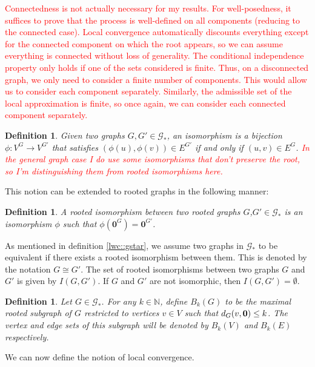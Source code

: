 \documentclass[12pt]{article}
\newcommand{\mb}{\mathbb}
\newcommand{\mc}{\mathcal}
\newcommand{\ra}{\rightarrow}
\newcommand{\tr}{\textcolor{red}}
\newcommand{\ind}{\hspace{24pt}}
\renewcommand{\root}{\mathbf{0}}					%
\newcommand{\met}[2]{
\ifstrempty{#2}{
	d_{#1}}{
	d_{#1,#2}}}										%
\newcommand{\gind}[1]{^{#1}}						%
\newcommand{\Gs}{\mc{G}_\ast}						%
\newcommand{\iso}{I}								%
\newcommand{\trnc}[1]{B_{#1}}						%
\newtheorem{defn}[thms]{Definition}
\begin{document}
\ind \tr{Connectedness is not actually necessary for my results. For well-posedness, it suffices to prove that the process is well-defined on all components (reducing to the connected case). Local convergence automatically discounts everything except for the connected component on which the root appears, so we can assume everything is connected without loss of generality. The conditional independence property only holds if one of the sets considered is finite. Thus, on a disconnected graph, we only need to consider a finite number of components. This would allow us to consider each component separately. Similarly, the admissible set of the local approximation is finite, so once again, we can consider each connected component separately.}

\begin{defn}
Given two graphs \(G,G' \in \Gs\), an isomorphism is a bijection \(\phi: V\gind{G} \ra V\gind{G'}\) that satisfies \((\phi(u),\phi(v)) \in E\gind{G'}\) if and only if \((u,v) \in E\gind{G}\). \tr{In the general graph case I do use some isomorphisms that don't preserve the root, so I'm distinguishing them from rooted isomorphisms here.}
\label{lwc::iso}
\end{defn}

This notion can be extended to rooted graphs in the following manner:

\begin{defn}
A rooted isomorphism between two rooted graphs \(G\),\(G' \in \Gs\) is an isomorphism \(\phi\) such that \(\phi(\root\gind{G}) = \root\gind{G'}\).
\label{lwc::riso}
\end{defn}

As mentioned in definition \ref{lwc::gstar}, we assume two graphs in \(\Gs\) to be equivalent if there exists a rooted isomorphism between them. This is denoted by the notation \(G \cong G'\). The set of rooted isomorphisms between two graphs \(G\) and \(G'\) is given by \(\iso(G,G')\). If \(G\) and \(G'\) are not isomorphic, then \(\iso(G,G') = \emptyset\).

\begin{defn}
Let \(G \in \Gs\). For any \(k \in \mb{N}\), define \(\trnc{k}(G)\) to be the maximal rooted subgraph of \(G\) restricted to vertices \(v \in V\) such that \(\met{G}{}(v,\root) \leq k\). The vertex and edge sets of this subgraph will be denoted by \(\trnc{k}(V)\) and \(\trnc{k}(E)\) respectively.
\label{lwc::trnc}
\end{defn}

We can now define the notion of local convergence.
\end{document}
